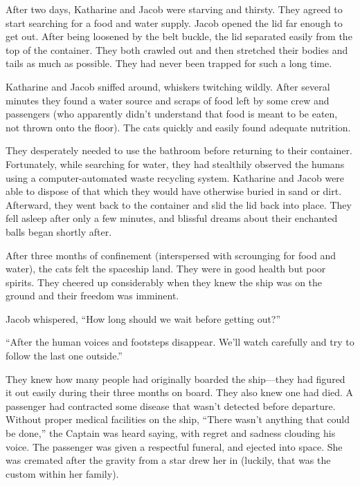 \timesep

After two days, Katharine and Jacob were starving and thirsty. They agreed to start searching for a food and water supply. Jacob opened the lid far enough to get out. After being loosened by the belt buckle, the lid separated easily from the top of the container. They both crawled out and then stretched their bodies and tails as much as possible. They had never been trapped for such a  long time.

Katharine and Jacob sniffed around, whiskers twitching wildly. After several minutes they found a water source and scraps of food left by some crew and passengers (who apparently didn't understand that food is meant to be eaten, not thrown onto the floor). The cats quickly and easily found adequate nutrition.

They desperately needed to use the bathroom before returning to their container. Fortunately, while searching for water, they had stealthily observed the humans using a computer-automated waste recycling system. Katharine and Jacob were able to dispose of that which they would have otherwise buried in sand or dirt. Afterward, they went back to the container and slid the lid back into place. They fell asleep after only a few minutes, and blissful dreams about their enchanted balls began shortly after.

\timesep

After three months of confinement (interspersed with scrounging for food and water), the cats felt the spaceship land. They were in good health but poor spirits. They cheered up considerably when they knew the ship was on the ground and their freedom was imminent.

Jacob whispered, “How long should we wait before getting out?”

“After the human voices and footsteps disappear. We'll watch carefully and try to follow the last one outside.”

They knew how many people had originally boarded the ship—they had figured it out easily during their three months on board. They also knew one had died. A passenger had contracted some disease that wasn't detected before departure. Without proper medical facilities on the ship, “There wasn't anything that could be done,” the Captain was heard saying, with regret and sadness clouding his voice. The passenger was given a respectful funeral, and ejected into space. She was cremated after the gravity from a star drew her in (luckily, that was the custom within her family).

